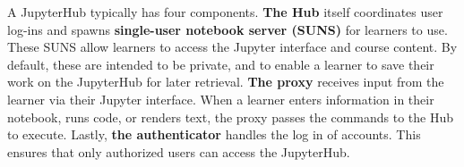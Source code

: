 A JupyterHub typically has four components. 
\textbf{The Hub} itself coordinates user log-ins and spawns \textbf{single-user notebook server (SUNS)} for learners to use.
These SUNS allow learners to access the Jupyter interface and course content.
By default, these are intended to be private, and to enable a learner to save their work on the JupyterHub for later retrieval. 
\textbf{The proxy} receives input from the learner via their Jupyter interface. 
When a learner enters information in their notebook, runs code, or renders text, the proxy passes the commands to the Hub to execute. 
Lastly, \textbf{the authenticator} handles the log in of accounts.
This ensures that only authorized users can access the JupyterHub. 